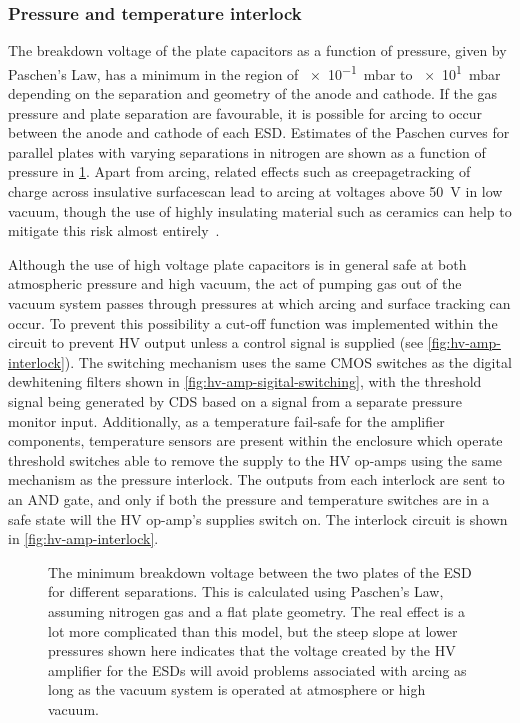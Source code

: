\subsubsection{Pressure and temperature interlock}
The breakdown voltage of the plate capacitors as a function of pressure, given by Paschen's Law, has a minimum in the region of \SI{e-1}{\milli\bar} to \SI{e1}{\milli\bar} depending on the separation and geometry of the anode and cathode. If the gas pressure and plate separation are favourable, it is possible for arcing to occur between the anode and cathode of each \gls{ESD}. Estimates of the Paschen curves for parallel plates with varying separations in nitrogen are shown as a function of pressure in \cref{fig:esd-paschen}. Apart from arcing, related effects such as creepage\textemdash tracking of charge across insulative surfaces\textemdash can lead to arcing at voltages above \SI{50}{\volt} in low vacuum, though the use of highly insulating material such as ceramics can help to mitigate this risk almost entirely~\cite{EN2010}.

Although the use of high voltage plate capacitors is in general safe at both atmospheric pressure and high vacuum, the act of pumping gas out of the vacuum system passes through pressures at which arcing and surface tracking can occur. To prevent this possibility a cut-off function was implemented within the circuit to prevent \gls{HV} output unless a control signal is supplied (see \cref{fig:hv-amp-interlock}). The switching mechanism uses the same \gls{CMOS} switches as the digital dewhitening filters shown in \cref{fig:hv-amp-sigital-switching}, with the threshold signal being generated by \gls{CDS} based on a signal from a separate pressure monitor input. Additionally, as a temperature fail-safe for the amplifier components, temperature sensors are present within the enclosure which operate threshold switches able to remove the supply to the \gls{HV} op-amps using the same mechanism as the pressure interlock. The outputs from each interlock are sent to an AND gate, and only if both the pressure and temperature switches are in a safe state will the \gls{HV} op-amp's supplies switch on. The interlock circuit is shown in \cref{fig:hv-amp-interlock}.

\begin{figure}
  \centering
  
  \caption[Minimum breakdown voltage between the two plates of the electrostatic drive for different separations]{\label{fig:esd-paschen}The minimum breakdown voltage between the two plates of the \gls{ESD} for different separations. This is calculated using Paschen's Law, assuming nitrogen gas and a flat plate geometry. The real effect is a lot more complicated than this model, but the steep slope at lower pressures shown here indicates that the voltage created by the \gls{HV} amplifier for the \glspl{ESD} will avoid problems associated with arcing as long as the vacuum system is operated at atmosphere or high vacuum.}
\end{figure}

